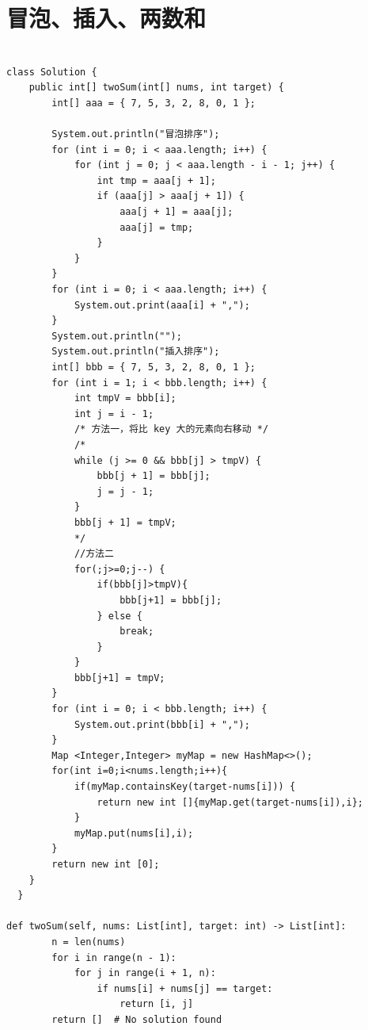 \documentclass[10pt]{article}
\begin{document}
\newpage %
\section{冒泡、插入、两数和}
\begin{multicols}{2}
\begin{lstlisting}[style=java, caption={}]

class Solution {
    public int[] twoSum(int[] nums, int target) {
        int[] aaa = { 7, 5, 3, 2, 8, 0, 1 };

        System.out.println("冒泡排序");
        for (int i = 0; i < aaa.length; i++) {
            for (int j = 0; j < aaa.length - i - 1; j++) {
                int tmp = aaa[j + 1];
                if (aaa[j] > aaa[j + 1]) {
                    aaa[j + 1] = aaa[j];
                    aaa[j] = tmp;
                }
            }
        }
        for (int i = 0; i < aaa.length; i++) {
            System.out.print(aaa[i] + ",");
        }
        System.out.println("");
        System.out.println("插入排序");
        int[] bbb = { 7, 5, 3, 2, 8, 0, 1 };
        for (int i = 1; i < bbb.length; i++) {
            int tmpV = bbb[i];
            int j = i - 1;
            /* 方法一，将比 key 大的元素向右移动 */
            /*
            while (j >= 0 && bbb[j] > tmpV) {
                bbb[j + 1] = bbb[j];
                j = j - 1;
            }
            bbb[j + 1] = tmpV;
            */
            //方法二
            for(;j>=0;j--) {
                if(bbb[j]>tmpV){
                    bbb[j+1] = bbb[j];
                } else {
                    break;
                }
            }
            bbb[j+1] = tmpV;
        }
        for (int i = 0; i < bbb.length; i++) {
            System.out.print(bbb[i] + ",");
        }
        Map <Integer,Integer> myMap = new HashMap<>();
        for(int i=0;i<nums.length;i++){
            if(myMap.containsKey(target-nums[i])) {
                return new int []{myMap.get(target-nums[i]),i};
            }
            myMap.put(nums[i],i);
        }
        return new int [0];
    }
  }

def twoSum(self, nums: List[int], target: int) -> List[int]:
        n = len(nums)
        for i in range(n - 1):
            for j in range(i + 1, n):
                if nums[i] + nums[j] == target:
                    return [i, j]
        return []  # No solution found


\end{lstlisting}
\end{multicols}
\end{document}

